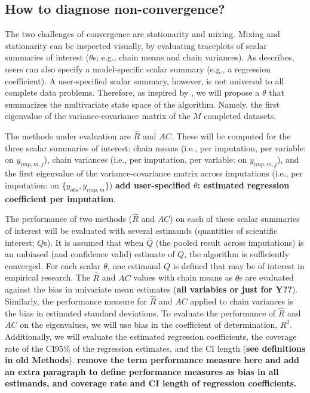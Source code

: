 \documentclass[Royal,times,sageh]{sagej}
\begin{document}
\hypertarget{how-to-diagnose-non-convergence}{%
\subsection{How to diagnose
non-convergence?}\label{how-to-diagnose-non-convergence}}

The two challenges of convergence are stationarity and mixing. Mixing
and stationarity can be inspected visually, by evaluating traceplots of
scalar summaries of interest (\(\theta\)s; e.g., chain means and chain
variances). As \citet{buur18} describes, users can also specify a
model-specific scalar summary (e.g., a regression coefficient). A
user-specified scalar summary, however, is not universal to all complete
data problems. Therefore, as inspired by \citep{mack03}, we will propose
a \(\theta\) that summarizes the multivariate state space of the
algorithm. Namely, the first eigenvalue of the variance-covariance
matrix of the \(M\) completed datasets.

The methods under evaluation are \(\widehat{R}\) and \(AC\). These will
be computed for the three scalar summaries of interest: chain means
(i.e., per imputation, per variable: on \(y_{imp, m, j}\)), chain
variances (i.e., per imputation, per variable: on \(y_{imp, m, j}\)),
and the first eigenvalue of the variance-covariance matrix across
imputations (i.e., per imputation: on \{\(y_{obs}, y_{imp, m}\)\})
\textbf{add user-specified \(\theta\): estimated regression coefficient
per imputation}.

The performance of two methods (\(\widehat{R}\) and \(AC\)) on each of
these scalar summaries of interest will be evaluated with several
estimands (quantities of scientific interest; \(Q\)s). It is assumed
that when \(\bar{Q}\) (the pooled result across imputations) is an
unbiased (and confidence valid) estimate of \(Q\), the algorithm is
sufficiently converged. For each scalar \(\theta\), one estimand \(Q\)
is defined that may be of interest in empirical research. The
\(\widehat{R}\) and \(AC\) values with chain means as \(\theta\)s are
evaluated against the bias in univariate mean estimates (\textbf{all
variables or just for Y??}). Similarly, the performance measure for
\(\widehat{R}\) and \(AC\) applied to chain variances is the bias in
estimated standard deviations. To evaluate the performance of
\(\widehat{R}\) and \(AC\) on the eigenvalues, we will use bias in the
coefficient of determination, \(R^2\). Additionally, we will evaluate
the estimated regression coefficients, the coverage rate of the CI95\%
of the regression estimates, and the CI length (\textbf{see definitions
in old Methods}). \textbf{remove the term performance measure here and
add an extra paragraph to define performance measures as bias in all
estimands, and coverage rate and CI length of regression coefficients.}
\end{document}
